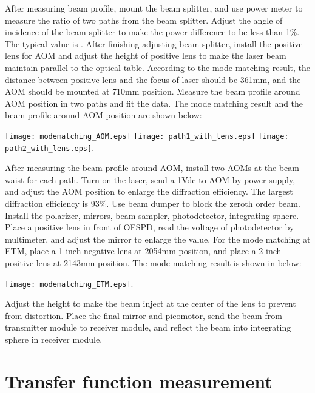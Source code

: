 After measuring beam profile, mount the beam splitter, and use power meter to measure the ratio of two paths from the beam splitter. Adjust the angle of incidence of the beam splitter to make the power difference to be less than 1$\%$. The typical value is \underline{\qquad\qquad}. After finishing adjusting beam splitter, install the positive lens for AOM and adjust the height of positive lens to make the laser beam maintain parallel to the optical table. According to the mode matching result, the distance between positive lens and the focus of laser should be 361mm, and the AOM should be mounted at 710mm position. Measure the beam profile around AOM position in two paths and fit the data. The mode matching result and the beam profile around AOM position are shown below:

\begin{center}
	\texttt{[image: modematching\_AOM.eps]}
	\texttt{[image: path1\_with\_lens.eps]}
	\texttt{[image: path2\_with\_lens.eps]}.
\end{center}



After measuring the beam profile around AOM, install two AOMs at the beam waist for each path. Turn on the laser, send a 1Vdc to AOM by power supply, and adjust the AOM position to enlarge the diffraction efficiency. The largest diffraction efficiency is 93$\%$. Use beam dumper to block the zeroth order beam. Install the polarizer, mirrors, beam sampler, photodetector, integrating sphere. Place a positive lens in front of OFSPD, read the voltage of photodetector by multimeter, and adjust the mirror to enlarge the value. For the mode matching at ETM, place a 1-inch negative lens at 2054mm position, and place a 2-inch positive lens at 2143mm position. The mode matching result is shown in below:

\begin{center}
	\texttt{[image: modematching\_ETM.eps]}.
\end{center}


Adjust the height to make the beam inject at the center of the lens to prevent from distortion. Place the final mirror and picomotor, send the beam from transmitter module to receiver module, and reflect the beam into integrating sphere in receiver module.


\section{Transfer function measurement}
